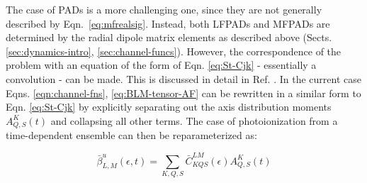 \documentclass[10pt]{article}
\begin{document}

The case of PADs is a more challenging one, since they are not generally described by Eqn.~\ref{eq:mfrealsig}. Instead, both LFPADs and MFPADs are determined by the radial dipole matrix elements as described above (Sects. \ref{sec:dynamics-intro}, \ref{sec:channel-funcs}). However, the correspondence of the problem with an equation of the form of Eqn. \ref{eq:St-Cjk} - essentially a convolution - can be made. This is discussed in detail in Ref. \cite{Underwood2000}. In the current case Eqns. \ref{eqn:channel-fns}, \ref{eq:BLM-tensor-AF} can be rewritten in a similar form to Eqn. \ref{eq:St-Cjk} by explicitly separating out the axis distribution moments $A_{Q,S}^{K}(t)$ and collapsing all other terms. The case of photoionization from a time-dependent ensemble can then be reparameterized as:




\begin{equation}
\bar{\beta}_{L,M}^{u}(\epsilon,t)=\sum_{K,Q,S}\bar{C}_{KQS}^{LM}(\epsilon)A_{Q,S}^{K}(t)
\label{eqn:beta-convolution-C}
\end{equation}
\end{document}
